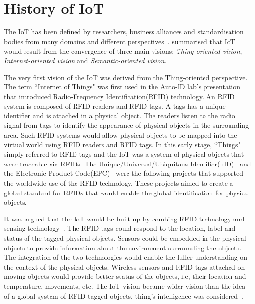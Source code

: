 \section{History of IoT}
\label{sec:history_of_iot}
The IoT has been defined by researchers, business alliances and standardisation bodies from many domains and different perspectives~\citep{Minerva:2015}.
\cite{Atzori:2010} summarised that IoT would result from the convergence of three main visions: \textit{Thing-oriented vision}, \textit{Internet-oriented vision} and \textit{Semantic-oriented vision}.

The very first vision of the IoT was derived from the Thing-oriented perspective.
The term ``Internet of Things" was first used in the Auto-ID lab's presentation that introduced Radio-Frequency Identification(RFID) technology. 
An RFID system is composed of RFID readers and RFID tags.
A tags has a unique identifier and is attached in a physical object.
The readers listen to the radio signal from tags to identify the appearance of physical objects in the surrounding area. 
Such RFID systems would allow physical objects to be mapped into the virtual world using RFID readers and RFID tags.
In this early stage, ``Things" simply referred to RFID tags and the IoT was a system of physical objects that were traceable via RFIDs. 
The Unique/Universal/Ubiquitous Identifier(uID)~\citep{Sakamura:2006} and the Electronic Product Code(EPC)~\citep{Armenio:2007} were the following projects that supported the worldwide use of the RFID technology.
These projects aimed to create a global standard for RFIDs that would enable the global identification for physical objects.

It was argued that the IoT would be built up by combing RFID technology and sensing technology~\citep{ITU:2005}.
The RFID tags could respond to the location, label and status of the tagged physical objects.
Sensors could be embedded in the physical objects to provide information about the environment surrounding the objects. 
The integration of the two technologies would enable the fuller understanding on the context of the physical objects.
Wireless sensors and RFID tags attached on moving objects would provide better status of the objects, i.e, their location and temperature, movements, etc.
The IoT vision became wider vision than the idea of a global system of RFID tagged objects, thing's intelligence was considered~\citep{Sterling:2005}. 

